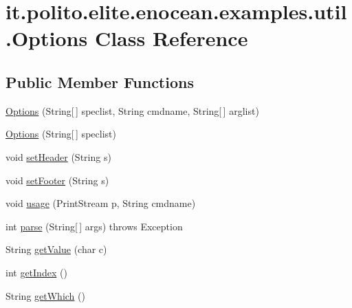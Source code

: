 \hypertarget{classit_1_1polito_1_1elite_1_1enocean_1_1examples_1_1util_1_1_options}{}\section{it.\+polito.\+elite.\+enocean.\+examples.\+util.\+Options Class Reference}
\label{classit_1_1polito_1_1elite_1_1enocean_1_1examples_1_1util_1_1_options}
\subsection*{Public Member Functions}
\begin{DoxyCompactItemize}
\item 
\hyperlink{classit_1_1polito_1_1elite_1_1enocean_1_1examples_1_1util_1_1_options_a9b3777ed58f5e94eb786a17d1dcf179a}{Options} (String\mbox{[}$\,$\mbox{]} speclist, String cmdname, String\mbox{[}$\,$\mbox{]} arglist)
\item 
\hyperlink{classit_1_1polito_1_1elite_1_1enocean_1_1examples_1_1util_1_1_options_a9bb00e26b51cf3fa044fb8db0715e3e9}{Options} (String\mbox{[}$\,$\mbox{]} speclist)
\item 
void \hyperlink{classit_1_1polito_1_1elite_1_1enocean_1_1examples_1_1util_1_1_options_a9e2db7144be1ca4a580754204a416b52}{set\+Header} (String s)
\item 
void \hyperlink{classit_1_1polito_1_1elite_1_1enocean_1_1examples_1_1util_1_1_options_a9b1cfe704a99879244c220539a1da10a}{set\+Footer} (String s)
\item 
void \hyperlink{classit_1_1polito_1_1elite_1_1enocean_1_1examples_1_1util_1_1_options_a2147573c225eeaac81cef1f12b6f3235}{usage} (Print\+Stream p, String cmdname)
\item 
int \hyperlink{classit_1_1polito_1_1elite_1_1enocean_1_1examples_1_1util_1_1_options_a16d1c95c87bc1b6eeacb20ee90860a05}{parse} (String\mbox{[}$\,$\mbox{]} args)  throws Exception 
\item 
String \hyperlink{classit_1_1polito_1_1elite_1_1enocean_1_1examples_1_1util_1_1_options_a1d7582549531826d41e895665179e3fd}{get\+Value} (char c)
\item 
int \hyperlink{classit_1_1polito_1_1elite_1_1enocean_1_1examples_1_1util_1_1_options_a2fc9d29475324ffb5cbc5306951a007a}{get\+Index} ()
\item 
String \hyperlink{classit_1_1polito_1_1elite_1_1enocean_1_1examples_1_1util_1_1_options_a41ce5bb446782e4953d711dc57dc7b12}{get\+Which} ()
\end{DoxyCompactItemize}
